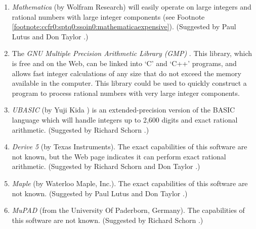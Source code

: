 \begin{enumerate}

\item {}\emph{Mathematica} 
      \cite{bibref:s:wolframmathematica} (by Wolfram Research) will easily operate on large integers and 
      rational numbers with large integer components  (see
      Footnote \ref{footnote:ccfr0:sptq0:ssoin0:mathematicaexpensive}).
      (Suggested by  Paul Lutus \cite{bibref:i:paullutus} and
       Don Taylor \cite{bibref:i:dontaylor}.)

\item {}The 
      \emph{GNU Multiple Precision Arithmetic 
      Library (GMP)} \cite{bibref:s:gnumultipleprecisionarithmeticlibrary}.
      This library, which is free and on the Web, can be linked into
      `C' and `C++' programs, and allows fast integer calculations of
      any size that do not exceed the memory available in the computer.
      This library could be used to quickly construct a program to 
      process rational numbers with very large integer components.

\item {}\emph{UBASIC} \cite{bibref:s:ubasic} 
      (by Yuji Kida \cite{bibref:i:yujikida})
      is an extended-precision version of the BASIC
      language which will handle integers up to 2,600 digits and
      exact rational arithmetic. (Suggested by  Richard Schorn 
      \cite{bibref:i:richardschorn}.)

\item {}\emph{Derive 5} \cite{bibref:s:derive5} (by Texas Instruments).
      The exact capabilities of this software are not known, but the Web page indicates
      it can perform exact rational arithmetic.  (Suggested by  Richard Schorn 
      \cite{bibref:i:richardschorn} and  Don Taylor \cite{bibref:i:dontaylor}.)

\item {}\emph{Maple} \cite{bibref:s:maple} (by Waterloo
      Maple, Inc.).  The exact capabilities of this software are not known.
      (Suggested by 
       Paul Lutus \cite{bibref:i:paullutus} and
       Don Taylor \cite{bibref:i:dontaylor}.)

\item {}\emph{MuPAD} \cite{bibref:s:mupad} (from
      the University Of Paderborn, Germany).  The capabilities of this
      software are not known.  (Suggested by  Richard Schorn 
      \cite{bibref:i:richardschorn}.)

\end{enumerate}

